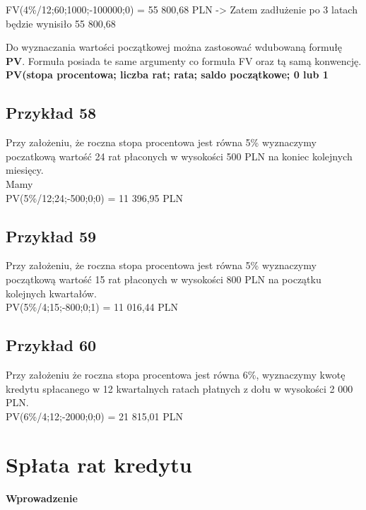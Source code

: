 \documentclass{article}
\begin{document}
FV(4\%/12;60;1000;-100000;0) = 55 800,68 PLN -> Zatem zadłużenie po 3 latach będzie wynisiło 55 800,68

Do wyznaczania wartości początkowej można zastosować wdubowaną formułę \textbf{PV}. Formuła posiada te same argumenty co formuła FV oraz tą samą konwencję.\\

\textbf{PV(stopa procentowa; liczba rat; rata; saldo początkowe; 0 lub 1}\\

\subsection{Przykład 58}

Przy założeniu, że roczna stopa procentowa jest równa 5\% wyznaczymy poczatkową wartość 24 rat płaconych w wysokości 500 PLN na koniec kolejnych miesięcy.\\

Mamy\\

PV(5\%/12;24;-500;0;0) = 11 396,95 PLN

\subsection{Przykład 59}

Przy założeniu, że roczna stopa procentowa jest równa 5\% wyznaczymy początkową wartość 15 rat płaconych w wysokości 800 PLN na początku kolejnych kwartałów.\\

PV(5\%/4;15;-800;0;1) = 11 016,44 PLN

\subsection{Przykład 60}

Przy założeniu że roczna stopa procentowa jest równa 6\%, wyznaczymy kwotę kredytu spłacanego w 12 kwartalnych ratach płatnych z dołu w wysokości 2 000 PLN.\\

PV(6\%/4;12;-2000;0;0) = 21 815,01 PLN

\newpage	

\section{Spłata rat kredytu}

\textbf{Wprowadzenie}\\
\end{document}
